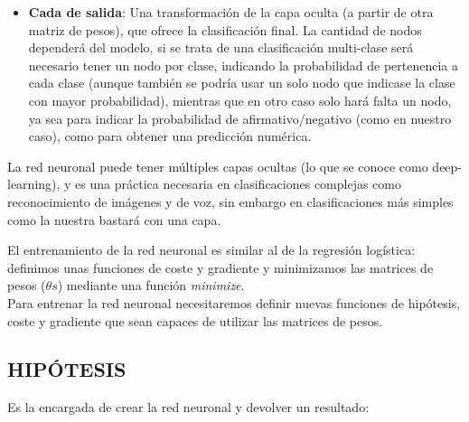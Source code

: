\documentclass[11pt]{article}
\providecommand{\tightlist}{%
      \setlength{\itemsep}{0pt}\setlength{\parskip}{0pt}}
\begin{document}
\begin{itemize}
\tightlist
\item
  \textbf{Cada de salida}: Una transformación de la capa oculta (a
  partir de otra matriz de pesos), que ofrece la clasificación final. La
  cantidad de nodos dependerá del modelo, si se trata de una
  clasificación multi-clase será necesario tener un nodo por clase,
  indicando la probabilidad de pertenencia a cada clase (aunque también
  se podría usar un solo nodo que indicase la clase con mayor
  probabilidad), mientras que en otro caso solo hará falta un nodo, ya
  sea para indicar la probabilidad de afirmativo/negativo (como en
  nuestro caso), como para obtener una predicción numérica.
\end{itemize}

La red neuronal puede tener múltiples capas ocultas (lo que se conoce
como deep-learning), y es una práctica necesaria en clasificaciones
complejas como reconocimiento de imágenes y de voz, sin embargo en
clasificaciones más simples como la nuestra bastará con una capa.

    El entrenamiento de la red neuronal es similar al de la regresión
logística: definimos unas funciones de coste y gradiente y minimizamos
las matrices de pesos (\(\theta s\)) mediante una función
\emph{minimize}.\\
Para entrenar la red neuronal necesitaremos definir nuevas funciones de
hipótesis, coste y gradiente que sean capaces de utilizar las matrices
de pesos.

    \subsection{HIPÓTESIS}\label{hipuxf3tesis}

    Es la encargada de crear la red neuronal y devolver un resultado:
\end{document}
